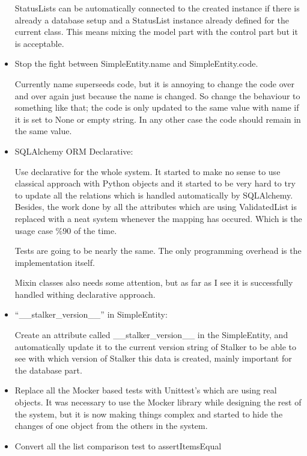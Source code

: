 \documentclass[a4paper,10pt,english]{sphinxmanual}
\begin{document}
\begin{itemize}
StatusLists can be automatically connected to the created instance if there
is already a database setup and a StatusList instance already defined for
the current class. This means mixing the model part with the control part
but it is acceptable.

\item {} 
Stop the fight between SimpleEntity.name and SimpleEntity.code.

Currently name superseeds code, but it is annoying to change the code over
and over again just because the name is changed. So change the behaviour to
something like that; the code is only updated to the same value with name if
it is set to None or empty string. In any other case the code should remain
in the same value.

\item {} 
SQLAlchemy ORM Declarative:

Use declarative for the whole system. It started to make no sense to use
classical approach with Python objects and it started to be very hard to try
to update all the relations which is handled automatically by SQLAlchemy.
Besides, the work done by all the attributes which are using ValidatedList
is replaced with a neat system whenever the mapping has occured. Which is
the usage case \%90 of the time.

Tests are going to be nearly the same. The only programming overhead is the
implementation itself.

Mixin classes also needs some attention, but as far as I see it is
successfully handled withing declarative approach.

\item {} 
``\_\_stalker\_version\_\_'' in SimpleEntity:

Create an attribute called \_\_stalker\_version\_\_ in the SimpleEntity, and
automatically update it to the current version string of Stalker to be able
to see with which version of Stalker this data is created, mainly important
for the database part.

\item {} 
Replace all the Mocker based tests with Unittest's which are using real
objects. It was necessary to use the Mocker library while designing the rest
of the system, but it is now making things complex and started to hide the
changes of one object from the others in the system.

\item {} 
Convert all the list comparison test to assertItemsEqual


\end{itemize}
\end{document}
